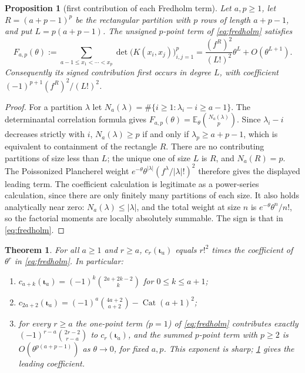 \documentclass[11pt,reqno]{amsart}
\theoremstyle{plain}
\newtheorem{theorem}{Theorem}[section]
\newtheorem{proposition}[proposition]{Proposition}
\theoremstyle{definition}
\theoremstyle{remark}
\newcommand{\Cat}{\operatorname{Cat}}
\let\greekiota\iota
\renewcommand{\iota}{\boldsymbol{\greekiota}}
\newcommand{\EE}{\mathbb{E}}
\begin{document}
\begin{proposition}[first contribution of each Fredholm term]\label{prop:rectangle}
Let $a,p\ge1$, let $R=(a+p-1)^p$ be the rectangular partition with
$p$ rows of length $a+p-1$, and put $L=p(a+p-1)$. The unsigned
$p$-point term of \eqref{eq:fredholm} satisfies
\[
F_{a,p}(\theta):=
\sum_{a-1\le x_1<\cdots<x_p}\det\bigl(K(x_i,x_j)\bigr)_{i,j=1}^{p}
=\frac{(f^R)^2}{(L!)^2}\theta^L+O(\theta^{L+1}).
\]
Consequently its signed contribution first occurs in degree $L$,
with coefficient $(-1)^{p+1}(f^R)^2/(L!)^2$.
\end{proposition}

\begin{proof}
For a partition $\lambda$ let
$N_a(\lambda)=\#\{i\ge1:\lambda_i-i\ge a-1\}$.
The determinantal correlation formula gives
$F_{a,p}(\theta)=\EE_\theta\binom{N_a(\lambda)}p$.
Since $\lambda_i-i$ decreases strictly with $i$,
$N_a(\lambda)\ge p$ if and only if $\lambda_p\ge a+p-1$,
which is equivalent to containment of the rectangle $R$.
There are no contributing partitions of size less than $L$;
the unique one of size $L$ is $R$, and $N_a(R)=p$.
The Poissonized Plancherel weight
$e^{-\theta}\theta^{|\lambda|}(f^\lambda/|\lambda|!)^2$
therefore gives the displayed leading term. The coefficient calculation
is legitimate as a power-series calculation, since there are only finitely
many partitions of each size. It also holds analytically near zero:
$N_a(\lambda)\le |\lambda|$, and the total weight at size $n$
is $e^{-\theta}\theta^n/n!$, so the factorial moments are locally
absolutely summable. The sign is that in \eqref{eq:fredholm}.
\end{proof}

\begin{theorem}\label{thm:bessel}
For all $a\ge1$ and $r\ge a$, $c_r(\iota_a)$ equals $r!^2$ times the coefficient of $\theta^r$ in \eqref{eq:fredholm}. In particular:
\begin{enumerate}
\item[(i)] $c_{a+k}(\iota_a)=(-1)^k\binom{2a+2k-2}{k}$ for $0\le k\le a+1$;
\item[(ii)] $c_{2a+2}(\iota_a)=(-1)^a\binom{4a+2}{a+2}-\Cat(a+1)^2$;
\item[(iii)] for every $r\ge a$ the one-point term ($p=1$) of \eqref{eq:fredholm} contributes exactly $(-1)^{r-a}\binom{2r-2}{r-a}$ to $c_r(\iota_a)$, and the summed $p$-point term with $p\ge2$ is
$O(\theta^{p(a+p-1)})$ as $\theta\to0$, for fixed $a,p$.
This exponent is sharp; \cref{prop:rectangle} gives the leading coefficient.
\end{enumerate}
\end{theorem}
\end{document}
